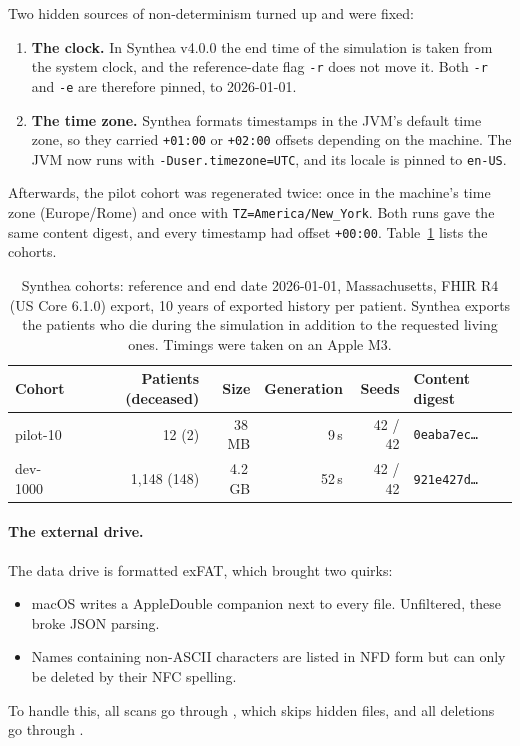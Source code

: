 \documentclass[11pt,a4paper]{article}
\newcommand{\code}[1]{\texttt{\detokenize{#1}}}
\begin{document}
Two hidden sources of non-determinism turned up and were fixed:
\begin{enumerate}
  \item \textbf{The clock.} In Synthea v4.0.0 the end time of the simulation is taken from the system clock, and the reference-date flag \texttt{-r} does not move it. Both \texttt{-r} and \texttt{-e} are therefore pinned, to 2026-01-01.
  \item \textbf{The time zone.} Synthea formats timestamps in the JVM's default time zone, so they carried \texttt{+01:00} or \texttt{+02:00} offsets depending on the machine. The JVM now runs with \texttt{-Duser.timezone=UTC}, and its locale is pinned to \texttt{en-US}.
\end{enumerate}
Afterwards, the pilot cohort was regenerated twice: once in the machine's time zone (Europe/Rome) and once with \texttt{TZ=America/New\_York}. Both runs gave the same content digest, and every timestamp had offset \texttt{+00:00}. Table~\ref{tab:cohorts} lists the cohorts.

\begin{table}[h]
\centering\small
\begin{tabular}{@{}lrrrrl@{}}
\toprule
Cohort & Patients (deceased) & Size & Generation & Seeds & Content digest \\
\midrule
pilot-10 & 12 (2) & 38\,MB & 9\,s & 42 / 42 & \texttt{0eaba7ec\ldots} \\
dev-1000 & 1,148 (148) & 4.2\,GB & 52\,s & 42 / 42 & \texttt{921e427d\ldots} \\
\bottomrule
\end{tabular}
\caption{Synthea cohorts: reference and end date 2026-01-01, Massachusetts, FHIR R4 (US Core 6.1.0) export, 10 years of exported history per patient. Synthea exports the patients who die during the simulation in addition to the requested living ones. Timings were taken on an Apple M3.}
\label{tab:cohorts}
\end{table}

\paragraph{The external drive.} The data drive is formatted exFAT, which brought two quirks:
\begin{itemize}
  \item macOS writes a \code{._*} AppleDouble companion next to every file. Unfiltered, these broke JSON parsing.
  \item Names containing non-ASCII characters are listed in NFD form but can only be deleted by their NFC spelling.
\end{itemize}
To handle this, all scans go through \code{iter_data_files}, which skips hidden files, and all deletions go through \code{remove_tree}.
\end{document}
